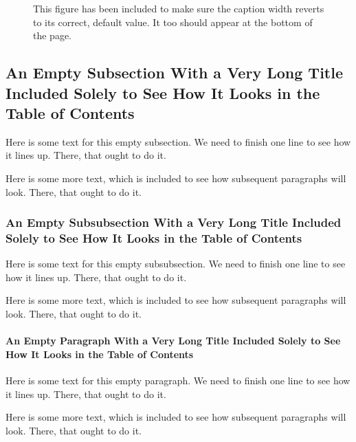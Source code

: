 \documentclass{article}
\begin{document}
\begin{figure}[b]
\begin{center}
\parbox{1.0\columnwidth}{\hrulefill{}\quad\hrulefill}
\parbox{0.8\columnwidth}{\hrulefill{}\quad\hrulefill}
\parbox{0.6\columnwidth}{\hrulefill{}\quad\hrulefill}
\parbox{0.4\columnwidth}{\hrulefill{}\quad\hrulefill}
\end{center}
\caption[Another sample figure]{This figure has been included to make sure the caption width reverts to its correct, default value.  It too should appear at the bottom of the page.}
\end{figure}

\subsection{An Empty Subsection With a Very Long Title Included Solely to See How It Looks in the Table of Contents}

Here is some text for this empty subsection.  We need to finish one line to see how it lines up.  There, that ought to do it.

Here is some more text, which is included to see how subsequent paragraphs will look.  There, that ought to do it.

\subsubsection{An Empty Subsubsection With a Very Long Title Included Solely to See How It Looks in the Table of Contents}

Here is some text for this empty subsubsection.  We need to finish one line to see how it lines up.  There, that ought to do it.

Here is some more text, which is included to see how subsequent paragraphs will look.  There, that ought to do it.

\paragraph{An Empty Paragraph With a Very Long Title Included Solely to See How It Looks in the Table of Contents}

Here is some text for this empty paragraph.  We need to finish one line to see how it lines up.  There, that ought to do it.

Here is some more text, which is included to see how subsequent paragraphs will look.  There, that ought to do it.
\end{document}

